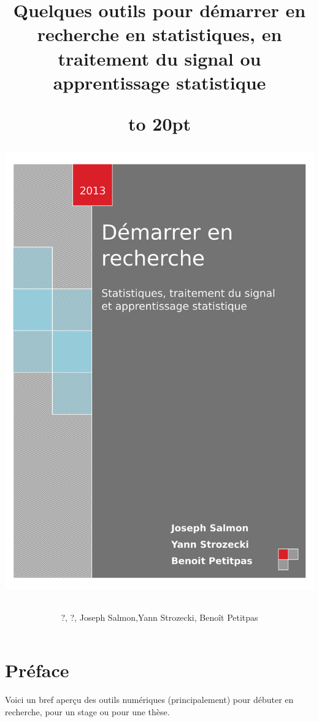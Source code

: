 \documentclass[a4paper,10pt]{book_ad}
\title{Quelques outils pour démarrer en recherche en statistiques, en traitement du signal
ou apprentissage statistique}
\author{?, ?, Joseph Salmon,Yann Strozecki, Benoît Petitpas}
\date {}
\begin{document}
\title{\vbox to 20pt{\vglue-280pt
\centerline{
\includegraphics{images/page-de-garde.pdf}
}
}
}

\author{}
\maketitle
\sloppy

\chapter*{Préface}

Voici un bref aperçu des outils numériques (principalement) pour débuter 
en recherche, pour un stage ou pour une thèse.
\end{document}
